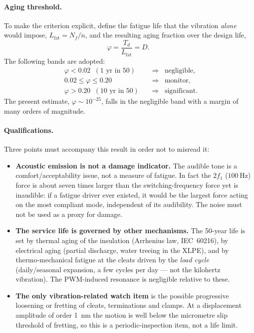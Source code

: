 \documentclass[11pt,a4paper,oneside]{book}
\begin{document}
\begin{onehalfspace}
\begin{appendices}
\paragraph{Aging threshold.}
To make the criterion explicit, define the fatigue life that the vibration
\emph{alone} would impose, $L_{\mathrm{fat}}=N_f/\dot n$, and the resulting aging
fraction over the design life,
\begin{equation}
	\varphi = \frac{T_d}{L_{\mathrm{fat}}} = D.
\end{equation}
The following bands are adopted:
\begin{equation}
	\boxed{\;
		\begin{aligned}
			&\varphi < 0.02 \;\;(\text{1 yr in 50}) && \Rightarrow\;\; \text{negligible},\\
			&0.02 \le \varphi \le 0.20 && \Rightarrow\;\; \text{monitor},\\
			&\varphi > 0.20 \;\;(\text{10 yr in 50}) && \Rightarrow\;\; \text{significant}.
		\end{aligned}
		\;}
\end{equation}
The present estimate, $\varphi\sim10^{-25}$, falls in the negligible band with a
margin of many orders of magnitude.

\paragraph{Qualifications.}
Three points must accompany this result in order not to misread it:
\begin{itemize}[leftmargin=*]
	\item[--] \textbf{Acoustic emission is not a damage indicator.} The audible tone
	is a comfort/acceptability issue, not a measure of fatigue. In fact the
	$2f_1$ ($\SI{100}{\hertz}$) force is about seven times larger than the
	switching-frequency force yet is inaudible: if a fatigue driver ever existed,
	it would be the largest force acting on the most compliant mode, independent of
	its audibility. The noise must not be used as a proxy for damage.
	\item[--] \textbf{The service life is governed by other mechanisms.} The
	\num{50}-year life is set by thermal aging of the insulation
	(Arrhenius law, IEC~60216), by electrical aging (partial discharge, water
	treeing in the XLPE), and by thermo-mechanical fatigue at the cleats driven by
	the \emph{load cycle} (daily/seasonal expansion, a few cycles per day --- not
	the kilohertz vibration). The PWM-induced resonance is negligible relative to
	these.
	\item[--] \textbf{The only vibration-related watch item} is the possible
	progressive loosening or fretting of cleats, terminations and clamps. At a
	displacement amplitude of order \SI{1}{\nano\meter} the motion is well below the
	micrometre slip threshold of fretting, so this is a periodic-inspection item,
	not a life limit.
\end{itemize}


\end{appendices}
\end{onehalfspace}
\end{document}
